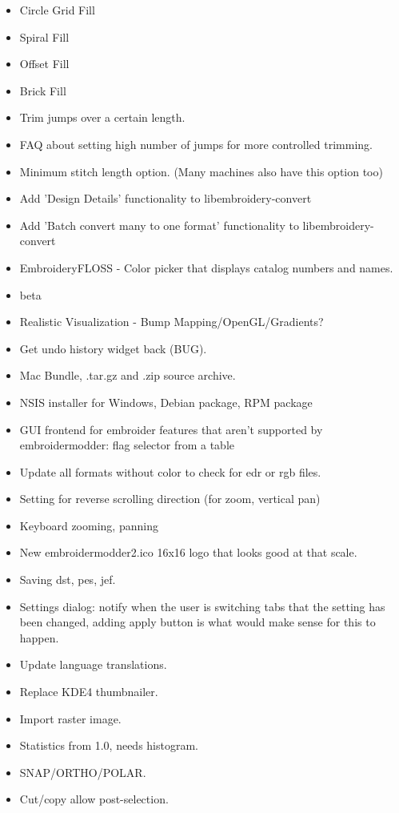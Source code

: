 \begin{itemize}
  \item Circle Grid Fill
  \item Spiral Fill
  \item Offset Fill
  \item Brick Fill
  \item Trim jumps over a certain length.
  \item FAQ about setting high number of jumps for more controlled trimming.
  \item Minimum stitch length option. (Many machines also have this option too)
  \item Add 'Design Details' functionality to libembroidery-convert
  \item Add 'Batch convert many to one format' functionality to libembroidery-convert
  \item EmbroideryFLOSS - Color picker that displays catalog numbers and names.
\item beta
  \item Realistic Visualization - Bump Mapping/OpenGL/Gradients?
  \item Get undo history widget back (BUG).
  \item Mac Bundle, .tar.gz and .zip source archive.
  \item NSIS installer for Windows, Debian package, RPM package
  \item GUI frontend for embroider features that aren't supported by embroidermodder: flag selector from a table
  \item Update all formats without color to check for edr or rgb files.
  \item Setting for reverse scrolling direction (for zoom, vertical pan)
  \item Keyboard zooming, panning
  \item New embroidermodder2.ico 16x16 logo that looks good at that scale.
  \item Saving dst, pes, jef.
  \item Settings dialog: notify when the user is switching tabs that the setting has been changed, adding apply button is what would make sense for this to happen.
  \item Update language translations.
  \item Replace KDE4 thumbnailer.
  \item Import raster image.
  \item Statistics from 1.0, needs histogram.
  \item SNAP/ORTHO/POLAR.
  \item Cut/copy allow post-selection.

\end{itemize}
